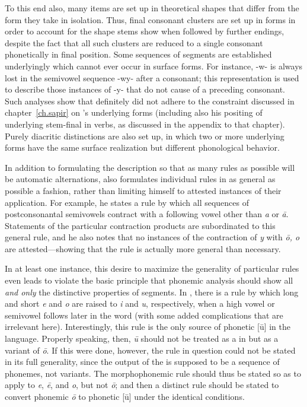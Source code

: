 To this end also, many items are set up in theoretical shapes that
differ from the form they take in isolation. Thus, final consonant
clusters are set up in  forms in order to account for the
shape stems show when followed by further endings, despite the fact
that all such clusters are reduced to a single consonant phonetically
in final position. Some sequences of segments are established
underlyingly which cannot ever occur in surface forms. For instance,
-w- is always lost in the semivowel sequence -wy- after a consonant;
this representation is used to describe those instances of -y- that do
not cause  of a preceding consonant. Such analyses show
that {\Bloomfield} definitely did not adhere to the constraint discussed
in chapter~\ref{ch.sapir} on {\Sapir}'s underlying forms (including also
his positing of underlying stem-final  in  verbs, as
discussed in the appendix to that chapter). Purely diacritic
distinctions are also set up, in which two or more underlying forms
have the same surface realization but different phonological behavior.

In addition to formulating the description so that as many rules as
possible will be automatic alternations, {\Bloomfield} also formulates
individual rules in as general as possible a fashion, rather than
limiting himself to attested instances of their application. For
example, he states a rule by which all sequences of postconsonantal
semivowels contract with a following vowel other than \emph{a} or
\emph{ā}. Statements of the particular contraction products are
subordinated to this general rule, and he also notes that no instances
of the contraction of \emph{y} with \emph{ō, o} are attested—showing
that the rule is actually more general than necessary.

In at least one instance, this desire to maximize the generality of
particular rules even leads {\Bloomfield} to violate the basic principle
that phonemic analysis should show all \emph{and only} the distinctive
properties of segments. In , there is a rule by which long and
short \emph{e} and \emph{o} are raised to \emph{i} and \emph{u},
respectively, when a high vowel or semivowel follows later in the word
(with some added complications that are irrelevant
here). Interestingly, this rule is the only source of phonetic [ū] in
the language. Properly speaking, then, \emph{ū} should not be treated
as a  in  but as a variant of \emph{ō}. If this were
done, however, the rule in question could not be stated in its full
generality, since the output of the  is supposed
to be a sequence of phonemes, not variants. The morphophonemic rule
should thus be stated so as to apply to \emph{e}, \emph{ē}, and
\emph{o}, but not \emph{ō}; and then a distinct rule should be stated
to convert phonemic \emph{ō} to phonetic [ū] under the identical
conditions.

